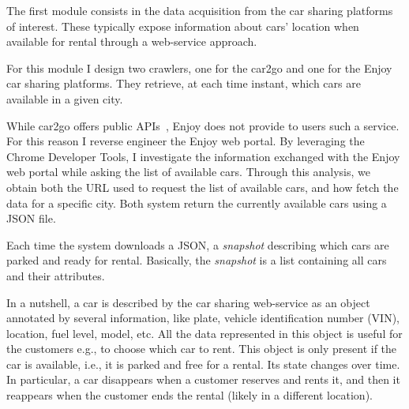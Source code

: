 The first module consists in the data acquisition from the car sharing platforms of interest. These typically expose information about cars' location when available for rental through a web-service approach. 

For this module I design two crawlers, one for the car2go and one for the Enjoy car sharing platforms. They retrieve, at each time instant, which cars are available in a given city.

While car2go offers public APIs~\cite{car2goAPI}, Enjoy does not provide to users such a service. For this reason I reverse engineer the Enjoy web portal. By leveraging the Chrome Developer Tools, I investigate the information exchanged with the Enjoy web portal while asking the list of available cars. Through this analysis, we obtain both the URL used to request the list of available cars, and how fetch the data for a specific city.
Both system return the currently available cars using a JSON file.

Each time the system downloads a JSON, a \textit{snapshot} describing which cars are parked and ready for rental. Basically, the \textit{snapshot} is a list containing all cars and their attributes.

In a nutshell, a car is described by the car sharing web-service as an object annotated by several information, like plate, vehicle identification number (VIN), location, fuel level, model, etc. 
All the data represented in this object is useful for the customers e.g., to choose which car to rent.
This object is only present if the car is available, i.e., it is parked and free for a rental. Its state changes over time. In particular, a car disappears when a customer reserves and rents it, and then it reappears when the customer ends the rental (likely in a different location).



